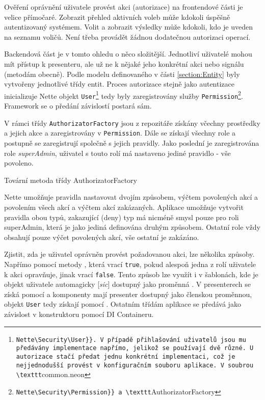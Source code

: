 Ověření oprávnění uživatele provést akci (autorizace) na frontendové části je velice přímočaré. Zobrazit přehled aktivních voleb může kdokoli úspěšně autentizovaný systémem. Volit a zobrazit výsledky může kdokoli, kdo je uveden na seznamu voličů. Není třeba provádět žádnou dodatečnou autorizaci operací.

Backendová část je v tomto ohledu o něco složitější. Jednotliví uživatelé mohou mít přístup k presenteru, ale už ne k nějaké jeho konkrétní akci nebo signálu (metodám obecně). Podle modelu definovaného v části \ref{section:Entity} byly vytvořeny jednotlivé třídy entit. Proces autorizace stejně jako autentizace inicializuje Nette objekt \texttt{User}\footnote{\label{user}\Verb{Nette\Security\User}}. V případě přihlašování uživatelů jsou mu předávány implementace napřímo, jelikož se používají dvě různé. U autorizace stačí předat jednu konkrétní implementaci, což je nejjednodušší provést v konfiguračním souboru aplikace. V soubrou \texttt{common.neon} tedy byly zaregistrovány služby \texttt{Permission}\footnote{\Verb{Nette\Security\Permission}} a \texttt{AuthorizatorFactory}. Framework se o předání závislostí postará sám.

V rámci třídy \texttt{AuthorizatorFactory} jsou z repozitáře získány včechny prostředky a jejich akce a zaregistrovány v \texttt{Permission}. Dále se získají všechny role a postupně se zaregistrují společně s jejich pravidly. Jako poslední je zaregistrována role \textit{superAdmin}, uživatel s touto rolí má nastaveno jediné pravidlo - vše povoleno. 

\begin{listing}[ht]
\caption{Tovární metoda třídy AuthorizatorFactory}
\label{php:autorizace}
\end{listing}

Nette umožňuje pravidla nastavovat dvojím způsobem, výčtem povolených akcí a povolením všech akcí a výčtem akcí zakázaných. Aplikace umožňuje vytvořit pravidla obou typů, zakazující (deny) typ má nicméně smysl pouze pro roli superAdmin, která je jako jediná definována druhým způsobem. Ostatní role vždy obsahují pouze výčet povolených akcí, vše ostatní je zakázáno.

Zjistit, zda je uživatel oprávněn provést požadovanou akci, lze několika způsoby. Napřímo pomocí metody , která vrací \texttt{true}, pokud alespoň jedna z rolí uživatele k akci opravňuje, jinak vrací \texttt{false}. Tento způsob lze využít i v šablonách, kde je objekt uživatele automagicky [\textit{sic}] dostupný jako proměnná %
. V presenterech se získá pomocí %
 a komponenty mají presenter dostupný jako členskou proměnnou, objekt \texttt{User} tedy získají pomocí %
. Ostatním třídám aplikace se předává jako závislost v konstruktoru pomocí DI Containeru.

